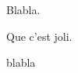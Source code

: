 \documentclass[10pt,a4paper]{article}
\begin{document}
Blabla.
\begin{cursive}
	Que c'est joli.
\end{cursive}
blabla
\end{document}
